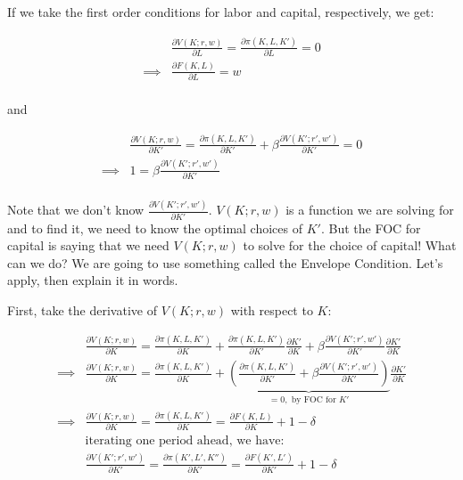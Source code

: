\documentclass[letterpaper,12pt]{article}
\theoremstyle{definition}
\begin{document}
\begin{spacing}{1.5}
If we take the first order conditions for labor and capital, respectively, we get:

\begin{equation}
\label{eqn:bellman_foc_l}
\begin{split}
&\frac{\partial V(K;r,w)}{\partial L} = \frac{\partial \pi(K,L,K')}{\partial L} = 0 \\
\implies & \frac{\partial F(K,L)}{\partial L} = w \\
\end{split}
\end{equation}

and 

\begin{equation}
\label{eqn:bellman_foc_k}
\begin{split}
&\frac{\partial V(K;r,w)}{\partial K'} = \frac{\partial \pi(K,L,K')}{\partial K'} + \beta \frac{\partial V(K'; r',w')}{\partial K'} = 0 \\
\implies & 1 = \beta \frac{\partial V(K';r',w')}{\partial K'}  \\
\end{split}
\end{equation}

Note that we don't know $\frac{\partial V(K';r',w')}{\partial K'}$.  $V(K;r,w)$ is a function we are solving for and to find it, we need to know the optimal choices of $K'$.  But the FOC for capital is saying that we need $V(K;r,w)$ to solve for the choice of capital!  What can we do?  We are going to use something called the Envelope Condition.  Let's apply, then explain it in words.

First, take the derivative of $V(K;r,w)$ with respect to $K$: 

\begin{equation}
\begin{split}
& \frac{\partial V(K;r,w)}{\partial K} = \frac{\partial \pi(K,L,K')}{\partial K} +  \frac{\partial \pi(K,L,K')}{\partial K'}\frac{\partial K'}{\partial K} + \beta  \frac{\partial V(K'; r',w')}{\partial K'}\frac{\partial K'}{\partial K} \\
\implies &  \frac{\partial V(K;r,w)}{\partial K} = \frac{\partial \pi(K,L,K')}{\partial K} +  \underbrace{\left(\frac{\partial \pi(K,L,K')}{\partial K'} + \beta  \frac{\partial V(K'; r',w')}{\partial K'}\right)}_{=0, \text{ by FOC for $K'$}}\frac{\partial K'}{\partial K} \\
\implies & \frac{\partial V(K;r,w)}{\partial K} = \frac{\partial \pi(K,L,K')}{\partial K} = \frac{\partial F(K,L)}{\partial K} + 1 - \delta \\
& \text{iterating one period ahead, we have:}\\
& \frac{\partial V(K';r',w')}{\partial K'} = \frac{\partial \pi(K',L',K'')}{\partial K'} =  \frac{\partial F(K',L')}{\partial K'} + 1 - \delta  \\
\end{split}
\end{equation}


\end{spacing}
\end{document}
